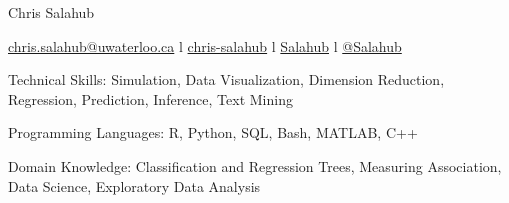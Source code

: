 \documentclass[a4paper,11pt]{article}
\newcommand*{\img}[1]{%
	\raisebox{0\baselineskip}{%
		\texttt{[image: \#1]}%
	}%
}
\newenvironment{compactDesc}
{ \begin{description}
		\setlength{\itemsep}{2pt}
		\setlength{\parskip}{2pt}
		\setlength{\parsep}{1pt}     }
	{ \end{description}                  }
\begin{document}
	\setlength{\tabcolsep}{0in}
	\setlength{\baselineskip}{2pt}
	\setlength{\lineskip}{2pt}
	\setlength{\parskip}{2pt}
	\setlength{\topskip}{2pt}

\begin{center}
	{\fontsize{35pt}{0pt} \selectfont Chris Salahub} \\
	\vspace{0.3cm}
	
	\href{mailto:chris.salahub@uwaterloo.ca}{\img{emailIcon} chris.salahub@uwaterloo.ca} \hspace{0.1cm} {\Large l} \hspace{0.1cm} 
	\href{https://www.linkedin.com/in/chris-salahub/}{\img{linkedinIcon} chris-salahub}  \hspace{0.1cm} {\Large l} \hspace{0.1cm}
	\href{https://github.com/Salahub}{\img{githubIcon} Salahub}  \hspace{0.1cm} {\Large l} \hspace{0.1cm}
	\href{https://medium.com/@Salahub}{\img{mediumIcon2} @Salahub} 
\end{center}



\vspace{0cm}

 \hrulefill
\begin{compactDesc}
	\item[Technical Skills:] {\footnotesize Simulation, Data Visualization, Dimension Reduction, Regression, Prediction, Inference, Text Mining }
	\item[Programming Languages:] {\footnotesize R, Python, SQL, Bash, MATLAB, C++}
	\item[Domain Knowledge:] {\footnotesize Classification and Regression Trees, Measuring Association, Data Science, Exploratory Data Analysis} %
\end{compactDesc}
\vspace{-4pt}
\end{document}
